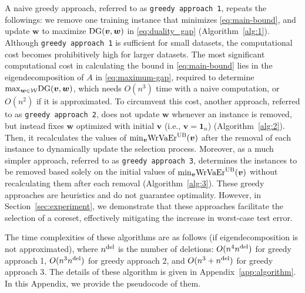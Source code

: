 A naive greedy approach, referred to as {\tt greedy approach 1}, repeats the followings: we remove one training instance that minimizes \eqref{eq:main-bound}, and update $\bm w$ to maximize ${\rm DG}(\bm v, \bm w)$ in \eqref{eq:duality_gap} (Algorithm~\ref{alg:1}).
%
Although {\tt greedy approach 1} is sufficient for small datasets, the computational cost becomes prohibitively high for larger datasets.
%
The most significant computational cost in calculating the bound in \eqref{eq:main-bound} lies in the eigendecomposition of $A$ in \eqref{eq:maximum-gap}, required to determine ${\rm max}_{\bm w \in {\mathcal W}}{\rm DG}(\bm v, \bm w)$, {which needs $O(n^3)$ time with a naive computation, or $O(n^2)$ if it is approximated}.
%
To circumvent this cost, another approach, referred to as {\tt greedy approach 2}, does not update $\bm w$ whenever an instance is removed, but instead fixes $\bm w$ optimized with initial $\bm v$ (i.e., $\bm v = \bm 1_n$) (Algorithm~\ref{alg:2}).
%
Then, it recalculates the values of ${\rm min}_{\bm v}\mathrm{WrVaEr}^{\mathrm{UB}}(\bm v)$ after the removal of each instance to dynamically update the selection process.
%
Moreover, as a much simpler approach, referred to as {\tt greedy approach 3}, determines the instances to be removed based solely on the initial values of ${\rm min}_{\bm v}\mathrm{WrVaEr}^{\mathrm{UB}}(\bm v)$ without recalculating them after each removal (Algorithm~\ref{alg:3}).
%
These greedy approaches are heuristics and do not guarantee optimality. However, in Section~\ref{sec:experiment}, we demonstrate that these approaches facilitate the selection of a coreset, effectively mitigating the increase in worst-case test error.

{The time complexities of these algorithms are as follows (if eigendecomposition is not approximated), where $n^{\rm del}$ is the number of deletions:
$O(n^4 n^{\rm del})$ for greedy approach 1,
$O(n^3 n^{\rm del})$ for greedy approach 2, and
$O(n^3 + n^{\rm del})$ for greedy approach 3.}
%
The details of these algorithm is given in {Appendix~\ref{app:algorithm}}. In this Appendix, we provide the pseudocode of them.
